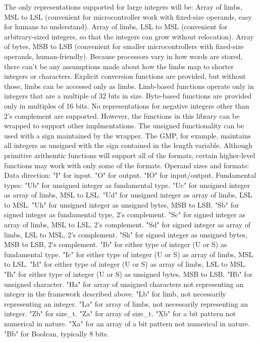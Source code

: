 The only representations supported for large integers will be:
Array of limbs, MSL to LSL (convenient for microcontroller work with fixed-size operands, easy for humans to understand).
Array of limbs, LSL to MSL (convenient for arbitrary-sized integers, so that the integers can grow without relocation).
Array of bytes, MSB to LSB (convenient for smaller microcontrollers with fixed-size operands, human-friendly).
Because processors vary in how words are stored, there can't be any assumptions made about how the limbs map to shorter integers or characters. Explicit conversion functions are provided, but without those, limbs can be accessed only as limbs.
Limb-based functions operate only in integers that are a multiple of 32 bits in size. Byte-based functions are provided only in multiples of 16 bits.
No representations for negative integers other than 2's complement are supported. However, the functions in this library can be wrapped to support other implmentations. The unsigned functionality can be used with a sign maintained by the wrapper. The GMP, for example, maintains all integers as unsigned with the sign contained in the length variable.
Although primitive arithemtic functions will support all of the formats, certain higher-level functions may work with only some of the formats.
Operand sizes and formats:
Data direction:
"I" for input.
"O" for output.
"IO" for input/output.
Fundamental types:
"Ub" for unsigned integer as fundamental type.
"Uc" for unsigned integer as array of limbs, MSL to LSL.
"Ud" for unsigned integer as array of limbs, LSL to MSL.
"Uh" for unsigned integer as unsigned bytes, MSB to LSB.
"Sb" for signed integer as fundamental type, 2's complement.
"Sc" for signed integer as array of limbs, MSL to LSL, 2's complement.
"Sd" for signed integer as array of limbs, LSL to MSL, 2's complement.
"Sh" for signed integer as unsigned bytes, MSB to LSB, 2's complement.
"Ib" for either type of integer (U or S) as fundamental type.
"Ic" for either type of integer (U or S) as array of limbs, MSL to LSL.
"Id" for either type of integer (U or S) as array of limbs, LSL to MSL.
"Ih" for either type of integer (U or S) as unsigned bytes, MSB to LSB.
"Hb" for unsigned character.
"Ha" for array of unsigned characters not representing an integer in the framework described above.
"Lb" for limb, not necessarily representing an integer.
"La" for array of limbs, not necessarily representing an integer.
"Zb" for size\_t.
"Za" for array of size\_t.
"Xb" for a bit pattern not numerical in nature.
"Xa" for an array of a bit pattern not numerical in nature.
"Bb" for Boolean, typically 8 bits.
